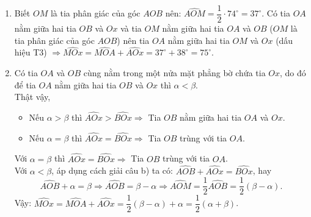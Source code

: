 \begin{vd}
{\begin{enumerate}
{
			}
			\item Biết $OM$ là tia phân giác của góc $AOB$ nên: $\widehat{AOM}=\dfrac{1}{2}\cdot 74^\circ=37^\circ$. Có tia $OA$ nằm giữa hai tia $OB$ và $Ox$ và tia $OM$ nằm giữa hai tia $OA$ và $OB$ ($OM$ là tia phân giác của góc $AOB$) nên tia $OA$ nằm giữa hai tia $OM$ và $Ox$ (dấu hiệu T3) $\Rightarrow \widehat{MOx}=\widehat{MOA}+\widehat{AOx}=37^\circ+38^\circ=75^\circ$.
			\item Có tia $OA$ và $OB$ cùng nằm trong một nửa mặt phẳng bờ chứa tia $Ox$, do đó để tia $OA$ nằm giữa hai tia $OB$ và $Ox$ thì $\alpha < \beta$.\\
			Thật vậy, 
			\begin{itemize}
				\item Nếu $\alpha > \beta$ thì $\widehat{AOx} > \widehat{BOx}      \Rightarrow$ Tia $OB$ nằm giữa hai tia $OA$ và $Ox$.
				\item Nếu $\alpha = \beta
				$ thì $\widehat{AOx}=\widehat{BOx}\Rightarrow $ Tia $OB$ trùng với tia $OA$.
			\end{itemize} 
			Với $\alpha=\beta$ thì $\widehat{AOx}=\widehat{BOx}\Rightarrow$ Tia $OB$ trùng với tia $OA$.\\
			Với $\alpha<\beta$, áp dụng cách giải câu b) ta có: $\widehat{AOB}+\widehat{AOx}=\widehat{BOx}$, hay
			\[\widehat{AOB}+\alpha = \beta \Rightarrow \widehat{AOB}=\beta - \alpha \Rightarrow \widehat{AOM}=\dfrac{1}{2}\widehat{AOB}=\dfrac{1}{2}(\beta - \alpha).\]
			Vậy: $\widehat{MOx}=\widehat{MOA}+\widehat{AOx}=\dfrac{1}{2}(\beta - \alpha)+\alpha=\dfrac{1}{2}(\alpha+\beta)$.
		\end{enumerate}
	}
\end{vd}

